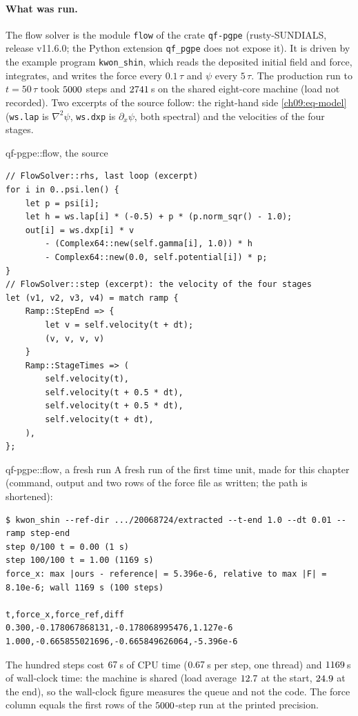 \paragraph{What was run.} The flow solver is the module \texttt{flow} of the crate \texttt{qf-pgpe} (rusty-SUNDIALS, release v11.6.0; the Python extension \texttt{qf\_pgpe} does not expose it). It is driven by the example program \texttt{kwon\_shin}, which reads the deposited initial field and force, integrates, and writes the force every $0.1\,\tau$ and $\psi$ every $5\,\tau$. The production run to $t=50\,\tau$ took $5000$ steps and $2741\,$s on the shared eight-core machine (load not recorded). Two excerpts of the source follow: the right-hand side \eqref{ch09:eq-model} (\texttt{ws.lap} is $\nabla^2\psi$, \texttt{ws.dxp} is $\partial_x\psi$, both spectral) and the velocities of the four stages.

\begin{rustbox}{qf-pgpe::flow, the source}
\begin{lstlisting}[style=rust]
// FlowSolver::rhs, last loop (excerpt)
for i in 0..psi.len() {
    let p = psi[i];
    let h = ws.lap[i] * (-0.5) + p * (p.norm_sqr() - 1.0);
    out[i] = ws.dxp[i] * v
        - (Complex64::new(self.gamma[i], 1.0)) * h
        - Complex64::new(0.0, self.potential[i]) * p;
}
// FlowSolver::step (excerpt): the velocity of the four stages
let (v1, v2, v3, v4) = match ramp {
    Ramp::StepEnd => {
        let v = self.velocity(t + dt);
        (v, v, v, v)
    }
    Ramp::StageTimes => (
        self.velocity(t),
        self.velocity(t + 0.5 * dt),
        self.velocity(t + 0.5 * dt),
        self.velocity(t + dt),
    ),
};
\end{lstlisting}
\end{rustbox}

\begin{rustbox}{qf-pgpe::flow, a fresh run}
A fresh run of the first time unit, made for this chapter (command, output and two rows of the force file as written; the path is shortened):
\begin{lstlisting}[style=plainmono]
$ kwon_shin --ref-dir .../20068724/extracted --t-end 1.0 --dt 0.01 --ramp step-end
step 0/100 t = 0.00 (1 s)
step 100/100 t = 1.00 (1169 s)
force_x: max |ours - reference| = 5.396e-6, relative to max |F| = 8.10e-6; wall 1169 s (100 steps)

t,force_x,force_ref,diff
0.300,-0.178067868131,-0.178068995476,1.127e-6
1.000,-0.665855021696,-0.665849626064,-5.396e-6
\end{lstlisting}
The hundred steps cost $67\,$s of CPU time ($0.67\,$s per step, one thread) and $1169\,$s of wall-clock time: the machine is shared (load average $12.7$ at the start, $24.9$ at the end), so the wall-clock figure measures the queue and not the code. The force column equals the first rows of the $5000$-step run at the printed precision.
\end{rustbox}

